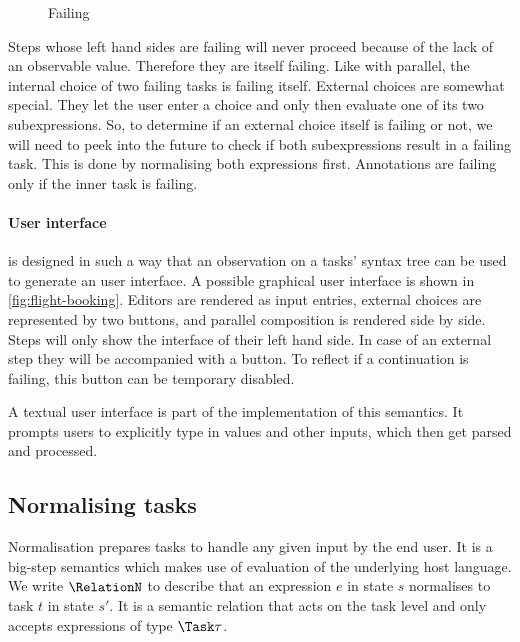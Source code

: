 \begin{figure}[h]
  \small
  \caption{Failing} \label{fig:observation-failing}
\end{figure}

Steps whose left hand sides are failing will never proceed because of the lack of an observable value.
Therefore they are itself failing.
Like with parallel, the internal choice of two failing tasks is failing itself.
External choices are somewhat special.
They let the user enter a choice and only then evaluate one of its two subexpressions.
So, to determine if an external choice itself is failing or not,
we will need to peek into the future to check if both subexpressions result in a failing task.
This is done by normalising both expressions first.
Annotations are failing only if the inner task is failing.



\paragraph{User interface}

\TOPHAT is designed in such a way that an observation on a tasks' syntax tree can be used to generate an user interface.
A possible graphical user interface is shown in \cref{fig:flight-booking}.
Editors are rendered as \HTML input entries,
external choices are represented by two buttons,
and parallel composition is rendered side by side.
Steps will only show the interface of their left hand side.
In case of an external step they will be accompanied with a button.
To reflect if a continuation is failing, this button can be temporary disabled.

A textual user interface is part of the implementation of this semantics.
It prompts users to explicitly type in values and other inputs,
which then get parsed and processed.



\subsection{Normalising tasks}
\label{sec:normalise}

Normalisation prepares tasks to handle any given input by the end user.
It is a big-step semantics which makes use of evaluation of the underlying host language.
We write $\RelationN$ to describe that
an expression $e$ in state $s$ normalises to task $t$ in state $s'$.
It is a semantic relation that acts on the task level
and only accepts expressions of type $\Task \tau$.

